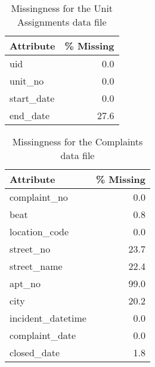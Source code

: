 \begin{table}[t!]
\caption{Missingness for the Unit Assignments data file}
\centering 
\begin{tabular}{lr}
\toprule
 Attribute &  \% Missing \\
\midrule
       uid &        0.0 \\
   unit\_no &        0.0 \\
start\_date &        0.0 \\
  end\_date &       27.6 \\
\bottomrule
\end{tabular}
\end{table}


\begin{table}[t!]
\caption{Missingness for the Complaints data file}
\centering 
\begin{tabular}{lr}
\toprule
        Attribute &  \% Missing \\
\midrule
     complaint\_no &        0.0 \\
             beat &        0.8 \\
    location\_code &        0.0 \\
        street\_no &       23.7 \\
      street\_name &       22.4 \\
           apt\_no &       99.0 \\
             city &       20.2 \\
incident\_datetime &        0.0 \\
   complaint\_date &        0.0 \\
      closed\_date &        1.8 \\
\bottomrule
\end{tabular}
\end{table}

